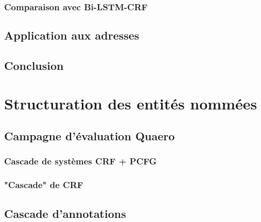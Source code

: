 \documentclass[12pt,a4paper,times,twoside,openright]{report}
\begin{document}
        \subsection{Comparaison avec Bi-LSTM-CRF}
        \label{subsec:taxonomy-ftb-lstm}
        

    \section{Application aux adresses}
    \label{sec:ontology-addresses}
    
    
    \section{Conclusion}
    \label{sec:morphology-chapter-conclusion}
    
    

\chapter{Structuration des entités nommées}
\label{chap:structured-NER}
\minitoc
    
    
    
    \section{Campagne d'évaluation Quaero}
    \label{sec:quaero-campaign}
    
    
        \subsection{Cascade de systèmes CRF + PCFG}
        \label{subsec:cascade-marco}
        
    
        \subsection{"Cascade" de CRF}
        \label{subsec:cascade-raymond}
        
    
    \section{Cascade d'annotations}
    \label{sec:annotation-cascade}
    
    
\end{document}
